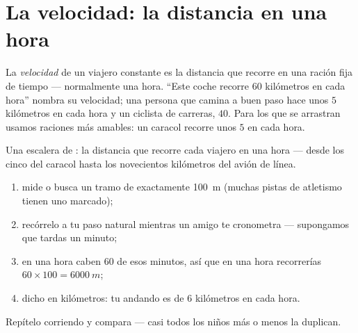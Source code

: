 \section{La velocidad: la distancia en una hora}

\begin{definition}[La velocidad]\label{def:g5:speed-distance-time:speed}
La \emph{velocidad} de un viajero constante es la
distancia que recorre en una ración fija de tiempo --- normalmente una
hora. ``Este coche recorre $60$ kilómetros en cada hora'' nombra su
velocidad; una persona que camina a buen paso hace unos $5$ kilómetros
en cada hora y un ciclista de carreras, $40$. Para los que se
arrastran usamos raciones más amables: un caracol recorre unos $5$
 en cada hora.
\end{definition}

\begin{omfigure}

{\small Una escalera de : la distancia que recorre cada
viajero en una hora --- desde los cinco  del caracol hasta los
novecientos kilómetros del avión de línea.}
\end{omfigure}

\begin{method}\label{met:g5:speed-distance-time:measure}
\begin{enumerate}
  \item mide o busca un tramo de exactamente \qty{100}{m} (muchas
        pistas de atletismo tienen uno marcado);
  \item recórrelo a tu paso natural mientras un amigo te cronometra
        --- supongamos que tardas un minuto;
  \item en una hora caben $60$ de esos minutos, así que en una hora
        recorrerías $60 \times 100 = \qty{6000}{m}$;
  \item dicho en kilómetros: tu  andando es de $6$
        kilómetros en cada hora.
\end{enumerate}
Repítelo corriendo y compara --- casi todos los niños más o menos la
duplican.
\end{method}

